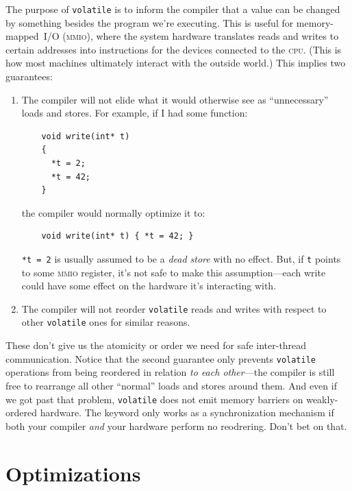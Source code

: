 \documentclass[fontsize=10pt, numbers=endperiod]{scrartcl}
\newcommand{\codesize}{\fontsize{10pt}{12pt}}
\newcommand{\monobox}[1]{\mbox{\texttt{#1}}}
\newcommand{\keyword}[1]{\monobox{\color{darkGreen}#1}}
\newcommand{\introduce}[1]{\textit{#1}}
\newenvironment{colfigure}
  {\par\vspace{1\baselineskip minus 0.5\baselineskip}\noindent\minipage{\linewidth}}
  {\endminipage\vspace*{1\baselineskip minus 0.7\baselineskip}}
\begin{document}
\begin{multicols*}{2}
The purpose of \keyword{volatile} is to inform the compiler that a value can
be changed by something besides the program we're executing.
This is useful for memory-mapped~\textsc{I/O} \textsc{(mmio)},
where the system hardware translates reads and writes to certain addresses
into instructions for the devices connected to the \textsc{cpu}.
(This is how most machines ultimately interact with the outside world.)
This implies two guarantees:
\begin{enumerate}
\item The compiler will not elide what it would otherwise see as ``unnecessary''
    loads and stores. For example, if I had some function:
    \begin{colfigure}
    \begin{verbatim}
    void write(int* t)
    {
      *t = 2;
      *t = 42;
    }
    \end{verbatim}
    \end{colfigure}
    the compiler would normally optimize it to:
    \begin{verbatim}
    void write(int* t) { *t = 42; }
    \end{verbatim}
    \texttt{*t = 2} is usually assumed to be a
    \introduce{dead store} with no effect.
    But, if \texttt{t} points to some \textsc{mmio} register, it's not
    safe to make this assumption---each write could have some effect
    on the hardware it's interacting with.

\item The compiler will not reorder \keyword{volatile}
    reads and writes with respect to other \keyword{volatile} ones
    for similar reasons.
\end{enumerate}

These don't give us the atomicity or order we need for safe
inter-thread communication.
Notice that the second guarantee only prevents \keyword{volatile} operations
from being reordered in relation \emph{to each other}---the compiler is still
free to rearrange all other ``normal'' loads and stores around them.
And even if we got past that problem, \keyword{volatile} does not emit memory
barriers on weakly-ordered hardware.
The keyword only works as a synchronization mechanism if both your compiler
\emph{and} your hardware perform no reodrering.
Don't bet on that.

\section{Optimizations}
\label{fusing}


\end{multicols*}
\end{document}

